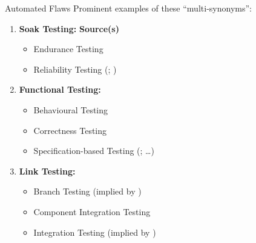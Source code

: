 \documentclass{beamer}
\newcommand{\citepISTQB}{\citepalias[\citeyear{ISTQB}]{ISTQB}}
\begin{document}
\begin{frame}{Automated Flaws}
    Prominent examples of these ``multi-synonyms'': \vspace{0.25cm}
    \begin{enumerate}
        \item \textbf{Soak Testing:} \hfill \textbf{Source(s)}
              \begin{itemize}
                  \item Endurance Testing {\hfill \tiny \citep[p.~39]{IEEE2021c}}
                  \item Reliability Testing {\hfill \tiny (\citealp[Tab.~2]{Gerrard2000a};
                                \citeyear[Tab.~1, p.~26]{Gerrard2000b})}
              \end{itemize} \pause
        \item \textbf{Functional Testing:}
              \begin{itemize}
                  \item Behavioural Testing {\hfill \tiny \citep[p.~45]{Kam2008}}
                  \item Correctness Testing {\hfill \tiny \citep[p.~5\=/7]{SWEBOK2024}}
                  \item Specification-based Testing {\hfill \tiny (\citealp[p.~196]{IEEE2017}; \dots{})}
              \end{itemize} \pause
        \item \textbf{Link Testing:}
              \begin{itemize}
                  \item Branch Testing {\hfill \tiny (implied by \citealp[p.~24]{IEEE2021c})}
                  \item Component Integration Testing {\hfill \tiny \citep[p.~45]{Kam2008}}
                  \item Integration Testing {\hfill \tiny (implied by \citealp[p.~13]{Gerrard2000a})}
              \end{itemize}
    \end{enumerate}
\end{frame}
\end{document}
